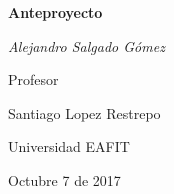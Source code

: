\begin{titlepage}
    \centering
    \vspace{2cm}

    {\huge\bfseries Anteproyecto\par}
    \vspace{5cm}
    {\Large\itshape Alejandro Salgado Gómez\par}
    \vfill

    Profesor\par
    {\large Santiago Lopez Restrepo\par}

    \vfill

    {\large Universidad EAFIT \par}
    \vspace{0.5cm}
    {\large Octubre 7 de 2017}
\end{titlepage}
